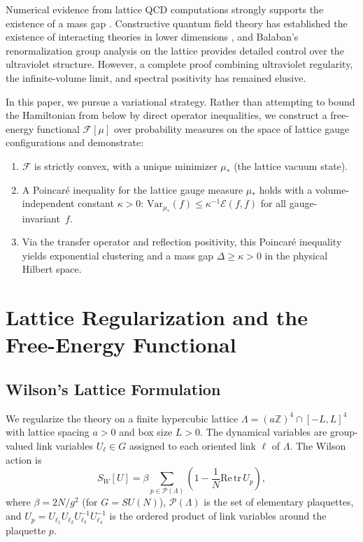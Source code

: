 \documentclass[12pt,a4paper]{article}
\theoremstyle{definition}
\theoremstyle{plain}
\theoremstyle{remark}
\begin{document}
Numerical evidence from lattice QCD computations strongly supports the existence of a mass gap \cite{Wilson1974, CreutzJacobsRebbi1983}. Constructive quantum field theory has established the existence of interacting theories in lower dimensions \cite{GlimmJaffe1987}, and Balaban's renormalization group analysis on the lattice \cite{Balaban1985a, Balaban1985b, Balaban1984c} provides detailed control over the ultraviolet structure. However, a complete proof combining ultraviolet regularity, the infinite-volume limit, and spectral positivity has remained elusive.

In this paper, we pursue a variational strategy. Rather than attempting to bound the Hamiltonian from below by direct operator inequalities, we construct a free-energy functional $\mathcal{F}[\mu]$ over probability measures on the space of lattice gauge configurations and demonstrate:
\begin{enumerate}
    \item $\mathcal{F}$ is strictly convex, with a unique minimizer $\mu_*$ (the lattice vacuum state).
    \item A Poincar\'e inequality for the lattice gauge measure $\mu_*$ holds with a volume-independent constant $\kappa > 0$: $\mathrm{Var}_{\mu_*}(f) \leq \kappa^{-1} \mathcal{E}(f,f)$ for all gauge-invariant~$f$.
    \item Via the transfer operator and reflection positivity, this Poincar\'e inequality yields exponential clustering and a mass gap $\Delta \geq \kappa > 0$ in the physical Hilbert space.
\end{enumerate}

\section{Lattice Regularization and the Free-Energy Functional}

\subsection{Wilson's Lattice Formulation}

We regularize the theory on a finite hypercubic lattice $\Lambda = (a\mathbb{Z})^4 \cap [-L, L]^4$ with lattice spacing $a > 0$ and box size $L > 0$. The dynamical variables are group-valued link variables $U_\ell \in G$ assigned to each oriented link $\ell$ of $\Lambda$. The Wilson action is
\begin{equation}\label{eq:Wilson-action}
    S_W[U] = \beta \sum_{p \in \mathcal{P}(\Lambda)} \left(1 - \frac{1}{N} \mathrm{Re}\, \mathrm{tr}\, U_p \right),
\end{equation}
where $\beta = 2N/g^2$ (for $G = SU(N)$), $\mathcal{P}(\Lambda)$ is the set of elementary plaquettes, and $U_p = U_{\ell_1} U_{\ell_2} U_{\ell_3}^{-1} U_{\ell_4}^{-1}$ is the ordered product of link variables around the plaquette $p$.
\end{document}
